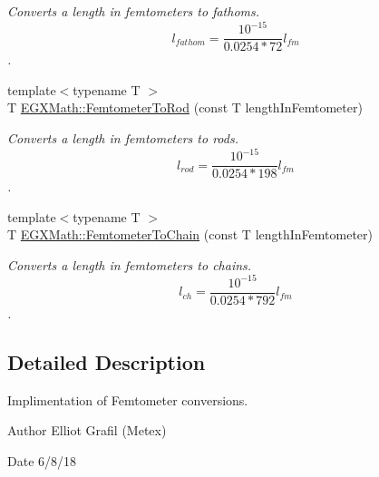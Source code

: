 \begin{DoxyCompactItemize}
\begin{DoxyCompactList}\small\item\em Converts a length in femtometers to fathoms. \[ l_{fathom}= \frac{10^{-15}}{0.0254 * 72} l_{fm} \]. \end{DoxyCompactList}\item 
{\footnotesize template$<$typename T $>$ }\\T \mbox{\hyperlink{group___e_g_x_math-_conversions-_length_conversions-_s_i-_femtometer-_surveyors_ga29f133c21de5eca2aa12f88caf6da86f}{E\+G\+X\+Math\+::\+Femtometer\+To\+Rod}} (const T length\+In\+Femtometer)
\begin{DoxyCompactList}\small\item\em Converts a length in femtometers to rods. \[ l_{rod}= \frac{10^{-15}}{0.0254 * 198} l_{fm} \]. \end{DoxyCompactList}\item 
{\footnotesize template$<$typename T $>$ }\\T \mbox{\hyperlink{group___e_g_x_math-_conversions-_length_conversions-_s_i-_femtometer-_surveyors_gac3220ddaefa889db44eb85690203f345}{E\+G\+X\+Math\+::\+Femtometer\+To\+Chain}} (const T length\+In\+Femtometer)
\begin{DoxyCompactList}\small\item\em Converts a length in femtometers to chains. \[ l_{ch}= \frac{10^{-15}}{0.0254 * 792} l_{fm} \]. \end{DoxyCompactList}\end{DoxyCompactItemize}


\subsection{Detailed Description}
Implimentation of Femtometer conversions. 

\begin{DoxyAuthor}{Author}
Elliot Grafil (Metex) 
\end{DoxyAuthor}
\begin{DoxyDate}{Date}
6/8/18 
\end{DoxyDate}

